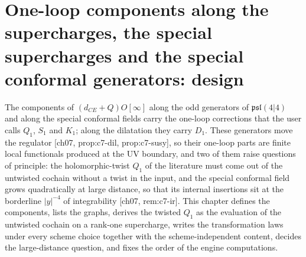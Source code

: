 \chapter{One-loop components along the supercharges, the special supercharges and the special conformal generators: design}

The components of $(d_{CE}+Q)O[\infty]$ along the odd generators of $\mathfrak{psl}(4|4)$ and along the special conformal fields carry the one-loop corrections that the user calls $Q_1$, $S_1$ and $K_1$; along the dilatation they carry $D_1$. These generators move the regulator [ch07, prop:c7-dil, prop:c7-susy], so their one-loop parts are finite local functionals produced at the UV boundary, and two of them raise questions of principle: the holomorphic-twist $Q_1$ of the literature must come out of the untwisted cochain without a twist in the input, and the special conformal field grows quadratically at large distance, so that its internal insertions sit at the borderline $|y|^{-4}$ of integrability [ch07, rem:c7-ir]. This chapter defines the components, lists the graphs, derives the twisted $Q_1$ as the evaluation of the untwisted cochain on a rank-one supercharge, writes the transformation laws under every scheme choice together with the scheme-independent content, decides the large-distance question, and fixes the order of the engine computations.

